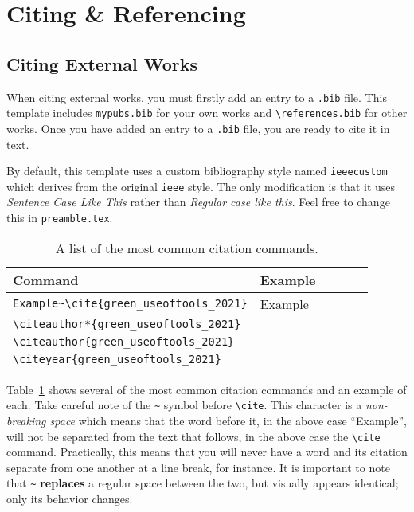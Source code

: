 
\section{Citing \& Referencing}%
\label{sec:basics-citing_and_referencing}%

\subsection*{Citing External Works}%
When citing external works, you must firstly add an entry to a \verb|.bib| file.
This template includes \verb|mypubs.bib| for your own works and \verb|\references.bib| for other works.
Once you have added an entry to a \verb|.bib| file, you are ready to cite it in text.

By default, this template uses a custom bibliography style named \verb|ieeecustom| which derives from the original \verb|ieee| style.
The only modification is that it uses \textit{Sentence Case Like This} rather than \textit{Regular case like this}.
Feel free to change this in \verb|preamble.tex|.

\begin{table}[!htbp]
  \centering
  \caption{A list of the most common citation commands.}%
  \label{table:basics-citing_examples}
  
  \begin{tabular}{>{\raggedright\arraybackslash}p{0.55\linewidth} >{\raggedright\arraybackslash}p{0.35\linewidth}}
    \textbf{Command} & \textbf{Example}\\
    \toprule

    \verb+Example~\cite{green_useoftools_2021}+ & Example~\cite{green_useoftools_2021}\\
    \verb+\citeauthor*{green_useoftools_2021}+ & \citeauthor*{green_useoftools_2021}\\
    \verb+\citeauthor{green_useoftools_2021}+ & \citeauthor{green_useoftools_2021}\\
    \verb+\citeyear{green_useoftools_2021}+ & \citeyear{green_useoftools_2021}

    \end{tabular}
\end{table}

Table~\ref{table:basics-citing_examples} shows several of the most common citation commands and an example of each.
Take careful note of the \verb|~| symbol before \verb|\cite|.
This character is a \textit{non-breaking space} which means that the word before it, in the above case ``Example'', will not be separated from the text that follows, in the above case the \verb|\cite| command.
Practically, this means that you will never have a word and its citation separate from one another at a line break, for instance.
It is important to note that \verb|~| \textbf{replaces} a regular space between the two, but visually appears identical; only its behavior changes.


